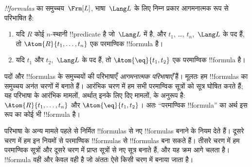 \documentclass[../../../include/open-logic-section]{subfiles}
\begin{document}
\begin{defn}[सूत्र]
\emph{!!{formula}s} का समुच्चय~$\Frm[L]$, भाषा~$\Lang L$ के लिए निम्न प्रकार
आगमनात्मक रूप से परिभाषित है:
\begin{enumerate}


\item यदि $R$ कोई $n$-स्थानी !!{predicate} है जो~$\Lang L$ में है, और
  $t_1$, \dots, $t_n$,~$\Lang L$ के पद हैं, तो $\Atom{R}{t_1,\ldots, t_n}$ एक
  परमाण्विक !!{formula} है।

\item यदि $t_1$ और $t_2$,~$\Lang L$ के पद हैं, तो $\Atom{\eq}{t_1, t_2}$
  एक परमाण्विक !!{formula} है।








\end{enumerate}
\end{defn}

\begin{explain}
पदों और !!{formula}s के समुच्चयों की परिभाषाएँ \emph{आगमनात्मक परिभाषाएँ}
हैं। मूलतः हम !!{formula}s का समुच्चय अनंत चरणों में बनाते हैं। आरंभिक चरण
में हम सभी परमाण्विक सूत्रों को सूत्र घोषित करते हैं; यह परिभाषा के आरंभिक
मामलों, अर्थात् इनके लिए दिए मामलों, के अनुरूप है:
%
%
$\Atom{R}{t_1,\dots,t_n}$ और $\Atom{\eq}{t_1,t_2}$। अतः ``परमाण्विक
!!{formula}'' का अर्थ इस रूप का कोई भी !!{formula} है।

परिभाषा के अन्य मामले पहले से निर्मित !!{formula}s से नए !!{formula}s बनाने
के नियम देते हैं। दूसरे चरण में हम इन नियमों से परमाण्विक !!{formula}s से
!!{formula}s बना सकते हैं। तीसरे चरण में हम परमाण्विक सूत्रों और दूसरे चरण
में प्राप्त सूत्रों से नए सूत्र बनाते हैं, और यह क्रम आगे चलता है।
!!{formula} वही और केवल वही है जो अंततः ऐसे किसी चरण में बनाया जाता है।
\end{explain}
\end{document}
